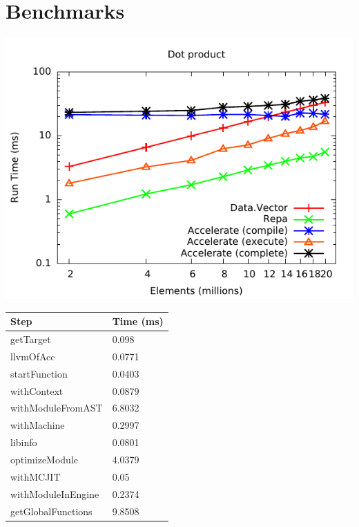 \documentclass[14pt]{beamer}\beamertemplatenavigationsymbolsempty
\begin{document}
\section{Benchmarks}
\begin{frame}
\includegraphics[width=\textwidth]{images/benchmarks/dotp/dotp}
\end{frame}

\begin{frame}
\begin{center}
\begin{tabular}{ll}
Step             & Time (ms)   \\ \hline
getTarget        & 0.098  \\
llvmOfAcc              & 0.0771 \\
startFunction    & 0.0403 \\
withContext      & 0.0879 \\
withModuleFromAST       & 6.8032 \\
withMachine      & 0.2997 \\
libinfo          & 0.0801 \\
optimizeModule   & 4.0379 \\
withMCJIT        & 0.05   \\
withModuleInEngine   & 0.2374 \\
getGlobalFunctions & 9.8508 \\
\end{tabular}
\end{center}
\end{frame}
\end{document}
